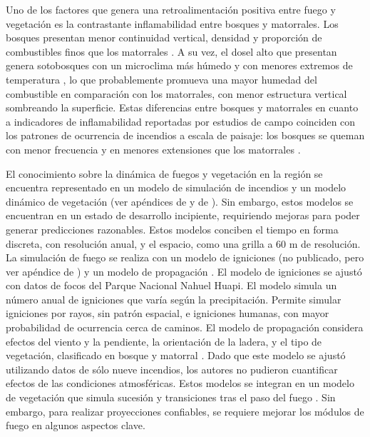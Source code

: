 
Uno de los factores que genera una retroalimentación positiva entre fuego y vegetación es la contrastante inflamabilidad entre bosques y matorrales. Los bosques presentan menor continuidad vertical, densidad y proporción de combustibles finos que los matorrales \citep{paritsis_positive_2015, blackhall_effects_2017, tiribelli_changes_2018}. A su vez, el dosel alto que presentan genera sotobosques con un microclima más húmedo y con menores extremos de temperatura \citep{paritsis_positive_2015}, lo que probablemente promueva una mayor humedad del combustible en comparación con los matorrales, con menor estructura vertical sombreando la superficie. Estas diferencias entre bosques y matorrales en cuanto a indicadores de inflamabilidad reportadas por estudios de campo coinciden con los patrones de ocurrencia de incendios a escala de paisaje: los bosques se queman con menor frecuencia y en menores extensiones que los matorrales \citep{mermoz_landscape_2005, morales_stochastic_2015, tiribelli_non-additive_2019}. 


El conocimiento sobre la dinámica de fuegos y vegetación en la región se encuentra representado en un modelo de simulación de incendios \citep{morales_stochastic_2015} y un modelo dinámico de vegetación (ver apéndices de \citealt{tiribelli_non-additive_2019} y de \citealt{kitzberger_projections_2022}). Sin embargo, estos modelos se encuentran en un estado de desarrollo incipiente, requiriendo mejoras para poder generar predicciones razonables. Estos modelos conciben el tiempo en forma discreta, con resolución anual, y el espacio, como una grilla a 60 m de resolución. La simulación de fuego se realiza con un modelo de igniciones (no publicado, pero ver apéndice de \citealt{kitzberger_projections_2022}) y un modelo de propagación \citep{morales_stochastic_2015}. El modelo de igniciones se ajustó con datos de focos del Parque Nacional Nahuel Huapi. El modelo simula un número anual de igniciones que varía según la precipitación. Permite simular igniciones por rayos, sin patrón espacial, e igniciones humanas, con mayor probabilidad de ocurrencia cerca de caminos. El modelo de propagación considera efectos del viento y la pendiente, la orientación de la ladera, y el tipo de vegetación, clasificado en bosque y matorral \citep{morales_stochastic_2015}. Dado que este modelo se ajustó utilizando datos de sólo nueve incendios, los autores no pudieron cuantificar efectos de las condiciones atmosféricas. Estos modelos se integran en un modelo de vegetación que simula sucesión y transiciones tras el paso del fuego \citep{kitzberger_projections_2022}. Sin embargo, para realizar proyecciones confiables, se requiere mejorar los módulos de fuego en algunos aspectos clave. 

